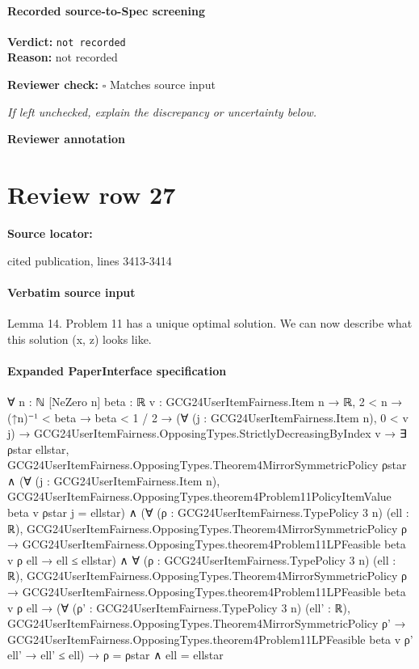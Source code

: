 \documentclass[10pt]{article}
\newcommand{\reviewerbox}{%
  \par\noindent\fbox{\parbox{0.96\linewidth}{\rule{0pt}{0.38in}}}\par
}
\newcommand{\reviewmatch}[1]{%
  \par\noindent\textbf{Reviewer check:} $\square$\; #1\par
  \noindent\emph{If left unchecked, explain the discrepancy or uncertainty below.}\par
}
\begin{document}
\paragraph{Recorded source-to-Spec screening}
\textbf{Verdict:} \texttt{not recorded}
\\
\textbf{Reason:} not recorded
\reviewmatch{Matches source input}
\noindent\textbf{Reviewer annotation}\par
\reviewerbox
\clearpage
\hypertarget{source-claim-053b388150665c75}{}
\section*{Review row 27}
\textbf{Source locator:} {\footnotesize\raggedright cited publication, lines 3413-\allowbreak{}3414\par}
\paragraph{Verbatim source input}
\begin{ReviewVerbatim}
Lemma 14. Problem 11 has a unique optimal solution.
We can now describe what this solution (x, z) looks like.
\end{ReviewVerbatim}


\paragraph{Expanded PaperInterface specification}
\begin{ReviewVerbatim}
∀ {n : ℕ} [NeZero n] {beta : ℝ} {v : GCG24UserItemFairness.Item n → ℝ},
  2 < n →
    (↑n)⁻¹ < beta →
      beta < 1 / 2 →
        (∀ (j : GCG24UserItemFairness.Item n), 0 < v j) →
          GCG24UserItemFairness.OpposingTypes.StrictlyDecreasingByIndex v →
            ∃ ρstar ellstar,
              GCG24UserItemFairness.OpposingTypes.Theorem4MirrorSymmetricPolicy ρstar ∧
                (∀ (j : GCG24UserItemFairness.Item n),
                    GCG24UserItemFairness.OpposingTypes.theorem4Problem11PolicyItemValue beta v ρstar j = ellstar) ∧
                  (∀ (ρ : GCG24UserItemFairness.TypePolicy 3 n) (ell : ℝ),
                      GCG24UserItemFairness.OpposingTypes.Theorem4MirrorSymmetricPolicy ρ →
                        GCG24UserItemFairness.OpposingTypes.theorem4Problem11LPFeasible beta v ρ ell → ell ≤ ellstar) ∧
                    ∀ (ρ : GCG24UserItemFairness.TypePolicy 3 n) (ell : ℝ),
                      GCG24UserItemFairness.OpposingTypes.Theorem4MirrorSymmetricPolicy ρ →
                        GCG24UserItemFairness.OpposingTypes.theorem4Problem11LPFeasible beta v ρ ell →
                          (∀ (ρ' : GCG24UserItemFairness.TypePolicy 3 n) (ell' : ℝ),
                              GCG24UserItemFairness.OpposingTypes.Theorem4MirrorSymmetricPolicy ρ' →
                                GCG24UserItemFairness.OpposingTypes.theorem4Problem11LPFeasible beta v ρ' ell' →
                                  ell' ≤ ell) →
                            ρ = ρstar ∧ ell = ellstar
\end{ReviewVerbatim}
\end{document}
